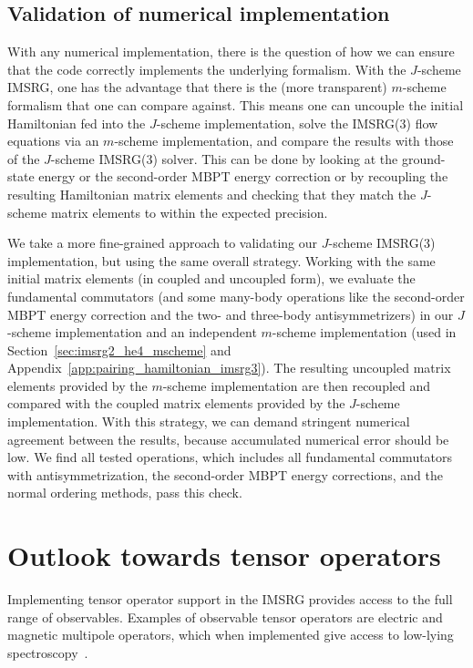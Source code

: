 \subsection{Validation of numerical implementation}

With any numerical implementation,
there is the question of how we can ensure that
the code correctly implements the underlying formalism.
With the $J$-scheme IMSRG,
one has the advantage that
there is the (more transparent) $m$-scheme formalism
that one can compare against.
This means one can uncouple the initial Hamiltonian
fed into the $J$-scheme implementation,
solve the IMSRG(3) flow equations via an $m$-scheme implementation,
and compare the results with those of the $J$-scheme IMSRG(3) solver.
This can be done by looking at the ground-state energy
or the second-order MBPT energy correction
or by recoupling the resulting Hamiltonian matrix elements
and checking that they match the $J$-scheme matrix elements
to within the expected precision.

We take a more fine-grained approach to validating
our $J$-scheme IMSRG(3) implementation,
but using the same overall strategy.
Working with the same initial matrix elements
(in coupled and uncoupled form),
we evaluate the fundamental commutators
(and some many-body operations like
the second-order MBPT energy correction and the two- and three-body antisymmetrizers)
in our $J$-scheme implementation
and an independent $m$-scheme implementation
(used in Section~\ref{sec:imsrg2_he4_mscheme} and Appendix~\ref{app:pairing_hamiltonian_imsrg3}).
The resulting uncoupled matrix elements
provided by the $m$-scheme implementation
are then recoupled and compared with the coupled matrix elements
provided by the $J$-scheme implementation.
With this strategy,
we can demand stringent numerical agreement between the results,
because accumulated numerical error should be low.
We find all tested operations,
which includes all fundamental commutators with antisymmetrization,
the second-order MBPT energy corrections,
and the normal ordering methods,
pass this check.

\section{Outlook towards tensor operators}\label{sec:tensor_jscheme}

Implementing tensor operator support in the IMSRG
provides access to the full range of observables.
Examples of observable tensor operators are
electric and magnetic multipole operators,
which when implemented give access to
low-lying spectroscopy~\cite{Parz17imsrg_em_obs}.

